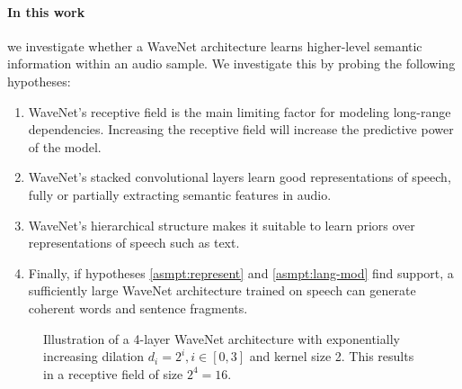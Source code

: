 \paragraph{In this work} we investigate whether a WaveNet architecture learns higher-level semantic information within an audio sample. 
We investigate this by probing the following hypotheses:
\begin{enumerate}
    \item\label{asmpt:rf-first} WaveNet's receptive field is the main limiting factor for modeling long-range dependencies. Increasing the receptive field will increase the predictive power of the model.
    \item\label{asmpt:represent} WaveNet's stacked convolutional layers learn good representations of speech, fully or partially extracting semantic features in audio.
    \item\label{asmpt:lang-mod} WaveNet's hierarchical structure makes it suitable to learn priors over representations of speech such as text. 
    \item\label{asmpt:end2end} Finally, if hypotheses \ref{asmpt:represent} and \ref{asmpt:lang-mod} find support, a sufficiently large WaveNet architecture trained on speech can generate coherent words and sentence fragments.
\end{enumerate}


\begin{figure}
    \centering
    \resizebox{0.7\columnwidth}{!}{
    }
    \caption{
    Illustration of a 4-layer WaveNet architecture with exponentially increasing dilation $d_i=2^i, i\in [0, 3]$ and kernel size 2.
    This results in a receptive field of size $2^4=16$. 
    }
    \label{fig:intro-wavenet}
\end{figure}







